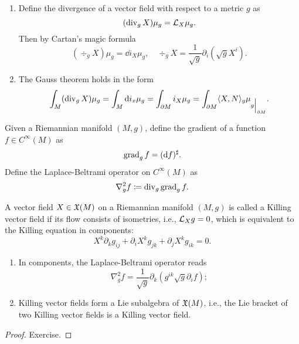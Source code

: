 \begin{cor}
    \begin{enumerate}
        \item Define the divergence of a vector field with respect to a metric $g$ as 
        \[(\operatorname{div}_g X)\mu_g=\mathcal{L}_X \mu_g.\]
        Then by Cartan's magic formula
        \[(\div_g X)\mu_g=\dd i_X \mu_g,\quad \div_g X=\frac{1}{\sqrt g}\partial_i(\sqrt g X^i).\label{divergence in components}\]
        \item The Gauss theorem holds in the form 
        \[\int_M (\div_g X)\mu_g=\int_M \dd i_x \mu_g=\int_{\partial M}i_X \mu_g=\int_{\partial M}\langle X,N\rangle_g \mu_{\restr{g}{\partial M}}.\]
    \end{enumerate}
\end{cor}

\begin{defn}
    Given a Riemannian manifold $(M,g)$, define the gradient  of a function $f\in C^\infty(M)$ as 
    \[\operatorname{grad}_g f=({\mathrm{d}} f)^\sharp.\]
    Define the Laplace-Beltrami operator  on $C^\infty(M)$ as
    \[\nabla^2_g f \coloneqq \operatorname{div}_g \operatorname{grad}_g f.\]
\end{defn}
\begin{defn}
    A vector field $X\in\mathfrak{X}(M)$ on a Riemannian manifold $(M,g)$ is called a Killing vector field if its flow consists of isometries, i.e., $\mathcal{L}_X g=0$, which is equivalent to the Killing equation in components:
    \[X^k\partial_k g_{ij}+\partial_i X^k g_{jk}+\partial_j X^k g_{ik}=0.\]
\end{defn}

\begin{cor}
    \begin{enumerate}
        \item In components, the Laplace-Beltrami operator reads 
        \[\nabla^2_g f=\frac{1}{\sqrt g}\partial_k (g^{ik}\sqrt g \partial_i f);\label{laplacian in components}\]
        \item Killing vector fields form a Lie subalgebra of $\mathfrak{X}(M)$, i.e., the Lie bracket of two Killing vector fields is a Killing vector field.
    \end{enumerate}
\end{cor}
\begin{proof}
    Exercise.
\end{proof}

